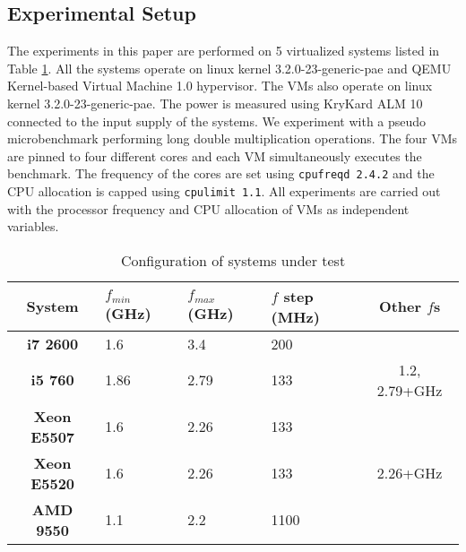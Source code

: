 \documentclass{sig-alternate}
\begin{document}
\subsection{Experimental Setup}\label{expW}
The experiments in this paper are performed on 5 virtualized systems listed in Table \ref{tab:sys}. All the systems operate on linux kernel 3.2.0-23-generic-pae and QEMU Kernel-based Virtual Machine 1.0 hypervisor. The VMs also operate on linux kernel 3.2.0-23-generic-pae. The power is measured using KryKard ALM 10 \cite{ALM10} connected to the input supply of the systems. We experiment with a pseudo microbenchmark performing long double multiplication operations. The four VMs are pinned to four different cores and each VM simultaneously executes the benchmark. The frequency of the cores are set using \texttt{cpufreqd 2.4.2} and the CPU allocation is capped using \texttt{cpulimit 1.1}. All experiments are carried out with the processor frequency and CPU allocation of VMs as independent variables. 
\begin{table}[!htbp]
\vspace{-0.5cm}
\caption{Configuration of systems under test}
\begin{center}
\begin{tabular}{|c|p{0.8cm}|p{0.8cm}|p{1cm}|c|}
\hline
\textbf{System}	&	$f_{min}$ (GHz)	&	$f_{max}$ (GHz)	&	$f$ step (MHz)	&	Other $f$s	\\	\hline
\textbf{i7 2600}	&	1.6	&	3.4	&	200	&		\\	\hline
\textbf{i5 760}	&	1.86	&	2.79	&	133	&	1.2, 2.79+GHz	\\	\hline
\textbf{Xeon E5507}	&	1.6	&	2.26	&	133	&		\\	\hline
\textbf{Xeon E5520}	&	1.6	&	2.26	&	133	&	2.26+GHz	\\	\hline
\textbf{AMD 9550}	&	1.1	&	2.2	&	1100	&		\\	\hline
\end{tabular}
\label{tab:sys}
\end{center}
\vspace{-0.5cm}
\end{table}
\end{document}
